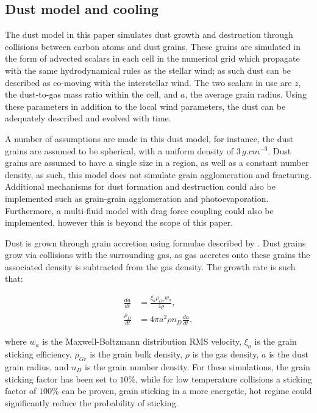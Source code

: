 \subsection{Dust model and cooling}

The dust model in this paper simulates dust growth and destruction through collisions between carbon atoms and dust grains. These grains are simulated in the form of advected scalars in each cell in the numerical grid which propagate with the same hydrodynamical rules as the stellar wind; as such dust can be described as co-moving with the interstellar wind. The two scalars in use are $z$, the dust-to-gas mass ratio within the cell, and $a$, the average grain radius. Using these parameters in addition to the local wind parameters, the dust can be adequately described and evolved with time. %

A number of assumptions are made in this dust model, for instance, the dust grains are assumed to be spherical, with a uniform density of $3 \, \si{g.cm^{-3}}$. Dust grains are assumed to have a single size in a region, as well as a constant number density, as such, this model does not simulate grain agglomeration and fracturing.
Additional mechanisms for dust formation and destruction could also be implemented such as grain-grain agglomeration and photoevaporation.
Furthermore, a multi-fluid model with drag force coupling could also be implemented, however this is beyond the scope of this paper.

Dust is grown through grain accretion using formulae described by \parencite{spitzer_jr._physical_2008}. Dust grains grow via collisions with the surrounding gas, as gas accretes onto these grains the associated density is subtracted from the gas density. The growth rate is such that:


\begin{subequations}
  \begin{align}
        \frac{da}{dt} & = \frac{\xi_a \rho_{Gr} w_a}{4 \rho} , \\
    \frac{\rho_D}{dt} & = 4 \pi a^2 \rho n_D \frac{da}{dt}   , 
  \end{align}
\end{subequations}

where $w_a$ is the Maxwell-Boltzmann distribution RMS velocity, $\xi_a$ is the grain sticking efficiency, $\rho_{Gr}$ is the grain bulk density, $\rho$ is the gas density, $a$ is the dust grain radius, and $n_D$ is the grain number density. For these simulations, the grain sticking factor has been set to $10\%$, while for low temperature collisions a sticking factor of $100\%$ can be proven, grain sticking in a more energetic, hot regime could significantly reduce the probability of sticking. 

